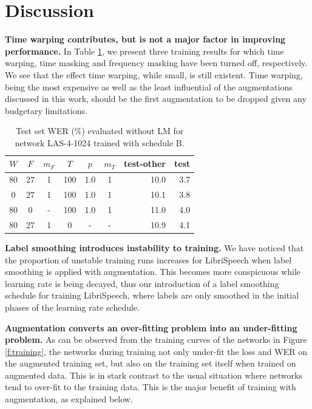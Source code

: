 \documentclass[a4paper]{article}
\begin{document}
\section{Discussion}\label{s:discussion}

\noindent\textbf{Time warping contributes, but is not a major factor in improving performance.} In Table \ref{tab:abalation}, we present three training results for which time warping, time masking and frequency masking have been turned off, respectively. We see that the effect time warping, while small, is still existent. Time warping, being the most expensive as well as the least influential of the augmentations discussed in this work, should be the first augmentation to be dropped given any budgetary limitations.
\smallskip

\begin{table}[th]
  \vskip -0.1in
  \caption{Test set WER (\%) evaluated without LM for network LAS-4-1024 trained with schedule B.}
  \label{tab:abalation}
  \centering
  \footnotesize
  \begin{tabular}{ccccccrr}
    \toprule
    $W$ & $F$ & $m_F$ & $T$ & $p$ & $m_T$ & test-other & test \\
    \midrule
    80 & 27 & 1 & 100 & 1.0 & 1 & 10.0 & 3.7 \\
    \midrule
    0  & 27 & 1 & 100 & 1.0 & 1 & 10.1 & 3.8 \\
    80 &  0 & - & 100 & 1.0 & 1 & 11.0 & 4.0 \\
    80 & 27 & 1 & 0 & - & - & 10.9 & 4.1 \\
    \bottomrule
  \end{tabular}
  \vskip -0.1in
\end{table}

\noindent\textbf{Label smoothing introduces instability to training.} We have noticed that the proportion of unstable training runs increases for LibriSpeech when label smoothing is applied with augmentation. This becomes more conspicuous while learning rate is being decayed, thus our introduction of a label smoothing schedule for training LibriSpeech, where labels are only smoothed in the initial phases of the learning rate schedule.
\smallskip

\noindent\textbf{Augmentation converts an over-fitting problem into an under-fitting problem.} As can be observed from the training curves of the networks in Figure \ref{f:training}, the networks during training not only under-fit the loss and WER on the augmented training set, but also on the training set itself when trained on augmented data. This is in stark contrast to the usual situation where networks tend to over-fit to the training data. This is the major benefit of training with augmentation, as explained below.
\smallskip
\end{document}
